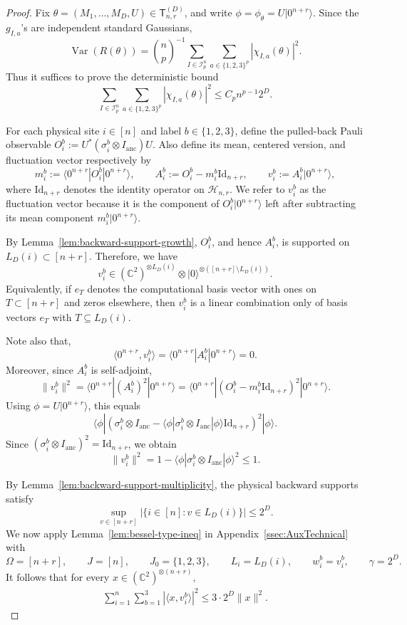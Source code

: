 \documentclass[12pt]{article}
\newcommand{\mcH}{\mathcal{H}}
\newcommand{\mcI}{\mathcal{I}}
\begin{document}
\begin{proof}
Fix \(\theta=(M_1,\dots,M_D,U)\in\mathsf{T}_{n,r}^{(D)}\), and write $\phi=\phi_\theta=U|0^{n+r}\rangle$. Since the \(g_{I,a}\)'s are independent standard Gaussians,
\[
\operatorname{Var}(R(\theta))
=
\binom np^{-1}
\sum_{I\in\mcI_p^n}
\sum_{a\in\{1,2,3\}^p}
|\chi_{I,a}(\theta)|^2 .
\]
Thus it suffices to prove the deterministic bound
\[
\sum_{I\in\mcI_p^n}
\sum_{a\in\{1,2,3\}^p}
|\chi_{I,a}(\theta)|^2
\le
C_p n^{p-1}2^D.
\]

For each physical site \(i\in[n]\) and label \(b\in\{1,2,3\}\), define the
pulled-back Pauli observable $O_i^b
    :=
    U^*(\sigma_i^b\otimes I_{\mathrm{anc}})U$. Also define its mean, centered version, and fluctuation vector respectively by
\[
    m_i^b
    :=
    \langle0^{n+r}|O_i^b|0^{n+r}\rangle,
    \qquad
    A_i^b
    :=
    O_i^b-m_i^b \mathrm{Id}_{n+r},
    \qquad
    v_i^b
    :=
    A_i^b|0^{n+r}\rangle,
\]
where $\mathrm{Id}_{n+r}$ denotes the identity operator on $\mcH_{n,r}$.
We refer to \(v_i^b\) as the fluctuation vector because it is the component of
\(O_i^b|0^{n+r}\rangle\) left after subtracting its mean component
\(m_i^b|0^{n+r}\rangle\). 

By Lemma~\ref{lem:backward-support-growth}, \(O_i^b\), and hence \(A_i^b\), is supported on \(L_D(i)\subset[n+r]\). Therefore, we have
\[
    v_i^b
    \in
    (\mathbb C^2)^{\otimes L_D(i)}
    \otimes
    |0\rangle^{\otimes([n+r]\setminus L_D(i))}.
\]
Equivalently, if \(e_T\) denotes the computational basis vector with ones on
\(T\subset[n+r]\) and zeros elsewhere, then \(v_i^b\) is a linear combination
only of basis vectors \(e_T\) with \(T\subseteq L_D(i)\).

Note also that,
\[
\langle 0^{n+r},v_i^b\rangle
=
\langle0^{n+r}|A_i^b|0^{n+r}\rangle
= 0
.
\]
Moreover, since \(A_i^b\) is self-adjoint,
\[
\|v_i^b\|^2
=
\langle0^{n+r}|(A_i^b)^2|0^{n+r}\rangle
=
\langle0^{n+r}|(O_i^b-m_i^b \mathrm{Id}_{n+r})^2|0^{n+r}\rangle .
\]
Using \(\phi=U |0^{n+r} \rangle\), this equals
\[
\langle
\phi
|
(
\sigma_i^b\otimes I_{\mathrm{anc}}
-
\langle\phi|\sigma_i^b\otimes I_{\mathrm{anc}}|\phi\rangle \mathrm{Id}_{n+r}
)^2
|
\phi
\rangle .
\]
Since \((\sigma_i^b\otimes I_{\mathrm{anc}})^2=\mathrm{Id}_{n+r}\), we obtain
\[
\|v_i^b\|^2
=
1-
\langle\phi|\sigma_i^b\otimes I_{\mathrm{anc}}|\phi\rangle^2
\le 1.
\]

By Lemma~\ref{lem:backward-support-multiplicity}, the physical backward
supports satisfy
\[
\sup_{v\in[n+r]}
|\{i\in[n]:v\in L_D(i)\} |
\le
2^D .
\]
We now apply Lemma~\ref{lem:bessel-type-ineq} in Appendix~\ref{ssec:AuxTechnical} with 
\[
    \Omega=[n+r],
    \qquad
    J=[n],
    \qquad
    J_0=\{1,2,3\},
    \qquad
    L_i=L_D(i),
    \qquad
    w_i^b=v_i^b,
    \qquad
    \gamma=2^D .
\]
It follows that for every
\(x\in(\mathbb C^2)^{\otimes(n+r)}\),
\begin{align}\label{eq:fluctuation-vectors-bound}
\sum_{i=1}^n\sum_{b=1}^3
|\langle x,v_i^b\rangle|^2
\le
3\cdot 2^D\|x\|^2.
\end{align}


\end{proof}
\end{document}
